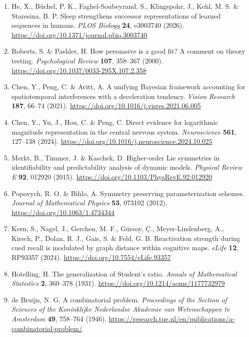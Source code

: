 \documentclass[11pt,a4paper]{article}
\begin{document}
\begin{enumerate}
  distinct processing stages in the human visual cortex. \emph{PLOS
  Biology} \textbf{23}, e3003189 (2025).
  \url{https://doi.org/10.1371/journal.pbio.3003189}
\item
  He, X., Büchel, P. K., Faghel-Soubeyrand, S., Klingspohr, J., Kehl, M.
  S. \& Staresina, B. P. Sleep strengthens successor representations of
  learned sequences in humans. \emph{PLOS Biology} \textbf{24}, e3003740
  (2026). \url{https://doi.org/10.1371/journal.pbio.3003740}
\item
  Roberts, S. \& Pashler, H. How persuasive is a good fit? A comment on
  theory testing. \emph{Psychological Review} \textbf{107}, 358–367
  (2000). \url{https://doi.org/10.1037/0033-295X.107.2.358}
\item
  Chen, Y., Peng, C. \& Avitt, A. A unifying Bayesian framework
  accounting for spatiotemporal interferences with a deceleration
  tendency. \emph{Vision Research} \textbf{187}, 66–74 (2021).
  \url{https://doi.org/10.1016/j.visres.2021.06.005}
\item
  Chen, Y., Yu, J., Hou, C. \& Peng, C. Direct evidence for logarithmic
  magnitude representation in the central nervous system.
  \emph{Neuroscience} \textbf{561}, 127–138 (2024).
  \url{https://doi.org/10.1016/j.neuroscience.2024.10.025}
\item
  Merkt, B., Timmer, J. \& Kaschek, D. Higher-order Lie symmetries in
  identifiability and predictability analysis of dynamic models.
  \emph{Physical Review E} \textbf{92}, 012920 (2015).
  \url{https://doi.org/10.1103/PhysRevE.92.012920}
\item
  Popovych, R. O. \& Bihlo, A. Symmetry preserving parameterization
  schemes. \emph{Journal of Mathematical Physics} \textbf{53}, 073102
  (2012). \url{https://doi.org/10.1063/1.4734344}
\item
  Kern, S., Nagel, J., Gerchen, M. F., Gürsoy, Ç., Meyer-Lindenberg, A.,
  Kirsch, P., Dolan, R. J., Gais, S. \& Feld, G. B. Reactivation
  strength during cued recall is modulated by graph distance within
  cognitive maps. \emph{eLife} \textbf{12}, RP93357 (2024).
  \url{https://doi.org/10.7554/eLife.93357}
\item
  Hotelling, H. The generalization of Student's ratio. \emph{Annals of
  Mathematical Statistics} \textbf{2}, 360–378 (1931).
  \url{https://doi.org/10.1214/aoms/1177732979}
\item
  de Bruijn, N. G. A combinatorial problem. \emph{Proceedings of the
  Section of Sciences of the Koninklijke Nederlandse Akademie van
  Wetenschappen te Amsterdam} \textbf{49}, 758–764 (1946).
  \url{https://research.tue.nl/en/publications/a-combinatorial-problem/}
\end{enumerate}
\end{document}
